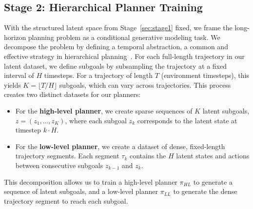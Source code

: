 \documentclass{article} %
\begin{document}
\subsection{Stage 2: Hierarchical Planner Training}
\label{sec:stage2}
\vspace{-5pt}
With the structured latent space from Stage~\ref{sec:stage1} fixed, we frame the long-horizon planning problem as a conditional generative modeling task. We decompose the problem by defining a temporal abstraction, a common and effective strategy in hierarchical planning~\citep{li2023hierarchical, chensimple}. For each full-length trajectory in our latent dataset, we define subgoals by subsampling the trajectory at a fixed interval of $H$ timesteps. For a trajectory of length $T$ (environment timesteps), this yields $K = \lfloor T / H \rfloor$ subgoals, which can vary across trajectories. This process creates two distinct datasets for our planners:
\begin{itemize}
    \item For the \textbf{high-level planner}, we create sparse sequences of $K$ latent subgoals, $z=(z_1, \dots, z_K)$, where each subgoal $z_k$ corresponds to the latent state at timestep $k \cdot H$.
    \item For the \textbf{low-level planner}, we create a dataset of dense, fixed-length trajectory segments. Each segment $\tau_k$ contains the $H$ latent states and actions between consecutive subgoals $z_{k-1}$ and $z_k$.
\end{itemize}
This decomposition allows us to train a high-level planner $\pi_{HL}$ to generate a sequence of latent subgoals, and a low-level planner $\pi_{LL}$ to generate the dense trajectory segment to reach each subgoal.
\end{document}
